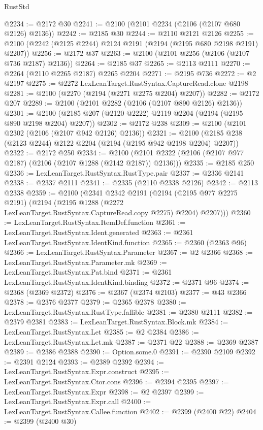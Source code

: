 \begin{lexlean}{RustStd}
\begin{coremodule}
@2234 := @2172 @30
@2241 := @2100 (@2101 @2234 (@2106 (@2107 @680 @2126) @2136))
@2242 := @2185 @30
@2244 := @2110 @2121 @2126
@2255 := @2100 (@2242 (@2125 @2244) @2124 @2191 (@2194 (@2195 @680 @2198 @2191) @2207))
@2256 := @2172 @37
@2263 := @2100 (@2101 @2256 (@2106 (@2107 @736 @2187) @2136))
@2264 := @2185 @37
@2265 := @2113 @2111
@2270 := @2264 (@2110 @2265 @2187) @2265 @2204
@2271 := @2195 @736
@2272 := @2 @2197
@2275 := @2272 LexLeanTarget.RustSyntax.CaptureRead.clone @2198
@2281 := @2100 (@2270 (@2194 (@2271 @2275 @2204) @2207))
@2282 := @2172 @207
@2289 := @2100 (@2101 @2282 (@2106 (@2107 @890 @2126) @2136))
@2301 := @2100 (@2185 @207 (@2120 @2222) @2119 @2204 (@2194 (@2195 @890 @2198 @2204) @2207))
@2302 := @2172 @238
@2309 := @2100 (@2101 @2302 (@2106 (@2107 @942 @2126) @2136))
@2321 := @2100 (@2185 @238 (@2123 @2244) @2122 @2204 (@2194 (@2195 @942 @2198 @2204) @2207))
@2322 := @2172 @250
@2334 := @2100 (@2101 @2322 (@2106 (@2107 @977 @2187) (@2106 (@2107 @1288 (@2142 @2187)) @2136)))
@2335 := @2185 @250
@2336 := LexLeanTarget.RustSyntax.RustType.pair
@2337 := @2336 @2141
@2338 := @2337 @2111
@2341 := @2335 (@2110 @2338 @2126)
@2342 := @2113 @2338
@2359 := @2100
    (@2341
      @2342
      @2191
      (@2194
        (@2195 @977 @2275 @2191)
        (@2194 (@2195 @1288 (@2272 LexLeanTarget.RustSyntax.CaptureRead.copy @2275) @2204) @2207)))
@2360 := LexLeanTarget.RustSyntax.ItemDef.function
@2361 := LexLeanTarget.RustSyntax.Ident.generated
@2363 := @2361 LexLeanTarget.RustSyntax.IdentKind.function
@2365 := @2360 (@2363 @96)
@2366 := LexLeanTarget.RustSyntax.Parameter
@2367 := @2 @2366
@2368 := LexLeanTarget.RustSyntax.Parameter.mk
@2369 := LexLeanTarget.RustSyntax.Pat.bind
@2371 := @2361 LexLeanTarget.RustSyntax.IdentKind.binding
@2372 := @2371 @96
@2374 := @2368 (@2369 @2372)
@2376 := @2367 (@2374 @2103)
@2377 := @43 @2366
@2378 := @2376 @2377
@2379 := @2365 @2378
@2380 := LexLeanTarget.RustSyntax.RustType.fallible
@2381 := @2380 @2111
@2382 := @2379 @2381
@2383 := LexLeanTarget.RustSyntax.Block.mk
@2384 := LexLeanTarget.RustSyntax.Let
@2385 := @2 @2384
@2386 := LexLeanTarget.RustSyntax.Let.mk
@2387 := @2371 @22
@2388 := @2369 @2387
@2389 := @2386 @2388
@2390 := Option.some.{0}
@2391 := @2390 @2109
@2392 := @2391 @2124
@2393 := @2389 @2392
@2394 := LexLeanTarget.RustSyntax.Expr.construct
@2395 := LexLeanTarget.RustSyntax.Ctor.cons
@2396 := @2394 @2395
@2397 := LexLeanTarget.RustSyntax.Expr
@2398 := @2 @2397
@2399 := LexLeanTarget.RustSyntax.Expr.call
@2400 := LexLeanTarget.RustSyntax.Callee.function
@2402 := @2399 (@2400 @22)
@2404 := @2399 (@2400 @30)

\end{coremodule}
\end{lexlean}
